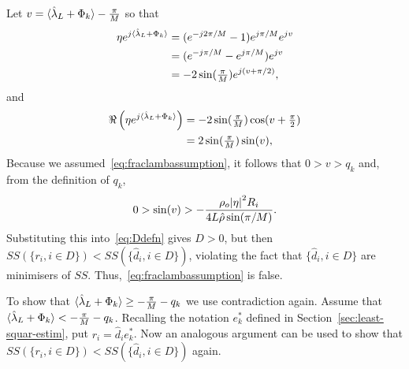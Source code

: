 \documentclass[journal]{IEEEtran}
\begin{document}
\begin{IEEEproof}
Let $v = \langle \hat{\lambda}_L + \Phi_k \rangle - \tfrac{\pi}{M}$ so that
\begin{align*}
\eta e^{j\langle \hat{\lambda}_L + \Phi_k \rangle} &= (e^{-j2\pi/M} - 1) e^{j \pi/M} e^{jv} \\
&= (e^{-j\pi/M} - e^{j\pi/M}) e^{jv} \\
&= -2 \sin(\tfrac{\pi}{M}) e^{j ( v + \pi/2) },
\end{align*}
and
\begin{align*}
\Re\left( \eta e^{j\langle \hat{\lambda}_L + \Phi_k \rangle}\right) &= -2 \sin(\tfrac{\pi}{M}) \cos(v + \tfrac{\pi}{2}) \\
 &= 2 \sin(\tfrac{\pi}{M}) \sin(v),
\end{align*}
Because we assumed~\eqref{eq:fraclambassumption}, it follows that $0 > v > q_k$ and, from the definition of $q_k$,
\[
0 > \sin(v) > -\frac{\rho_o {\vert \eta \vert}^2 R_i}{4 L \hat{\rho} \sin(\pi/M)}.
\]
Substituting this into~\eqref{eq:Ddefn} gives $D > 0$, but then $SS(\{r_i, i \in D\}) < SS(\{\hat{d}_i, i \in D\})$, violating the fact that $\{\hat{d}_i, i \in D\}$ are minimisers of $SS$.  Thus,~\eqref{eq:fraclambassumption} is false.

To show that $\langle \hat{\lambda}_L + \Phi_k \rangle \geq -\frac{\pi}{M} - q_k$ we use contradiction again.  Assume that $\langle \hat{\lambda}_L + \Phi_k \rangle < -\frac{\pi}{M} - q_k$.  Recalling the notation $e_k^*$ defined in Section~\ref{sec:least-squar-estim}, put $r_i = \hat{d}_i e_k^*$.  Now an analogous argument can be used to show that $SS(\{r_i, i \in D\}) < SS(\{\hat{d}_i, i \in D\})$ again.

\end{IEEEproof}
\end{document}
